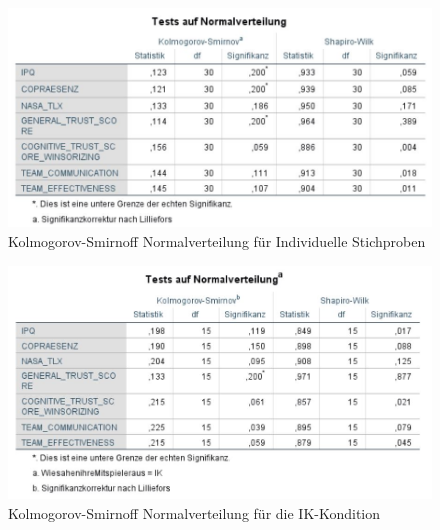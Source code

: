 \documentclass[a4paper,11pt]{article}%
\renewcommand{\\}{\vspace*{0.5\baselineskip} \newline}
\begin{document}
	\begin{figure}[H]
	\centering
		\begin{footnotesize}
			\includegraphics[scale=0.6]{Abbildungen/Post_QuestionnaireStatistiks/Normalverteilung_30}\\
			\caption{Kolmogorov-Smirnoff Normalverteilung für Individuelle Stichproben}
			\label{fig:KolSmirInd}
		\end{footnotesize}
	\end{figure}	
	
	\begin{figure}[H]
	\centering
		\begin{footnotesize}
			\includegraphics[scale=0.6]{Abbildungen/Post_QuestionnaireStatistiks/Normalverteilung_15_IK}\\
			\caption{Kolmogorov-Smirnoff Normalverteilung für die IK-Kondition}
			\label{fig:KolSmirIndIK}
		\end{footnotesize}
	\end{figure}	
	
\end{document}
